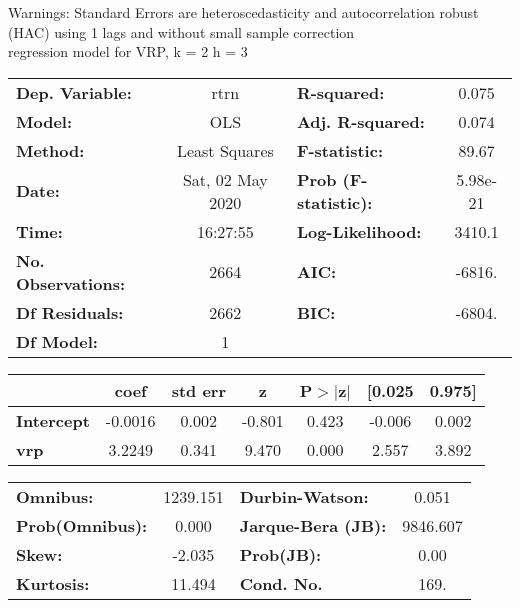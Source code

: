 Warnings: \newline
 [1] Standard Errors are heteroscedasticity and autocorrelation robust (HAC) using 1 lags and without small sample correction\\ 

regression model for VRP, k = 2 h = 3\begin{center}
\begin{tabular}{lclc}
\toprule
\textbf{Dep. Variable:}    &       rtrn       & \textbf{  R-squared:         } &     0.075   \\
\textbf{Model:}            &       OLS        & \textbf{  Adj. R-squared:    } &     0.074   \\
\textbf{Method:}           &  Least Squares   & \textbf{  F-statistic:       } &     89.67   \\
\textbf{Date:}             & Sat, 02 May 2020 & \textbf{  Prob (F-statistic):} &  5.98e-21   \\
\textbf{Time:}             &     16:27:55     & \textbf{  Log-Likelihood:    } &    3410.1   \\
\textbf{No. Observations:} &        2664      & \textbf{  AIC:               } &    -6816.   \\
\textbf{Df Residuals:}     &        2662      & \textbf{  BIC:               } &    -6804.   \\
\textbf{Df Model:}         &           1      & \textbf{                     } &             \\
\bottomrule
\end{tabular}
\begin{tabular}{lcccccc}
                   & \textbf{coef} & \textbf{std err} & \textbf{z} & \textbf{P$> |$z$|$} & \textbf{[0.025} & \textbf{0.975]}  \\
\midrule
\textbf{Intercept} &      -0.0016  &        0.002     &    -0.801  &         0.423        &       -0.006    &        0.002     \\
\textbf{vrp}       &       3.2249  &        0.341     &     9.470  &         0.000        &        2.557    &        3.892     \\
\bottomrule
\end{tabular}
\begin{tabular}{lclc}
\textbf{Omnibus:}       & 1239.151 & \textbf{  Durbin-Watson:     } &    0.051  \\
\textbf{Prob(Omnibus):} &   0.000  & \textbf{  Jarque-Bera (JB):  } & 9846.607  \\
\textbf{Skew:}          &  -2.035  & \textbf{  Prob(JB):          } &     0.00  \\
\textbf{Kurtosis:}      &  11.494  & \textbf{  Cond. No.          } &     169.  \\
\bottomrule
\end{tabular}
\end{center}

